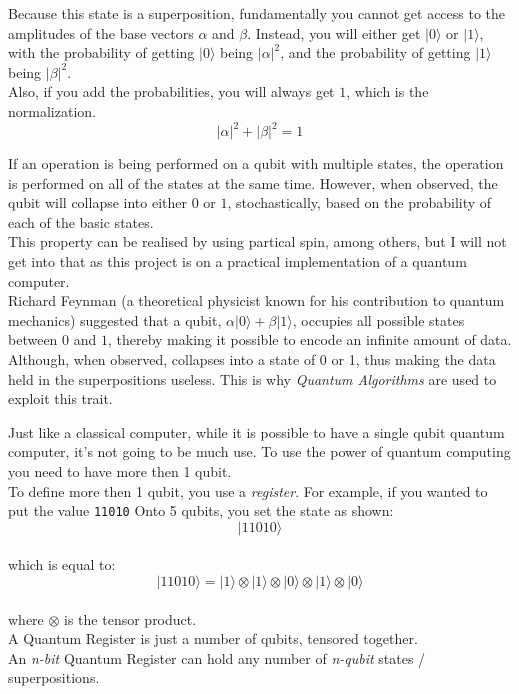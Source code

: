\documentclass[../main.tex]{subfiles}
\begin{document}
Because this state is a superposition, fundamentally you cannot get
access to the amplitudes of the base vectors \(\alpha\) and \(\beta\).
Instead, you will either get \(\lvert0\rangle\) or \(\lvert1\rangle\), with the
probability of getting \(\lvert0\rangle\) being \(\lvert\alpha\lvert^2\), and the
probability of getting \(\lvert1\rangle\) being \(\lvert\beta\lvert^2\).\\
Also, if you add the probabilities, you will always get \(1\), which is
the normalization.\\
\begin{equation}
	\lvert\alpha\lvert^2 + \lvert\beta\lvert^2 = 1
\end{equation}

If an operation is being performed on a qubit with multiple states, the
operation is performed on all of the states at the same time. However,
when observed, the qubit will collapse into either \(0\) or \(1\),
stochastically, based on the probability of each of the basic states.\\
This property can be realised by using partical spin, among others, but
I will not get into that as this project is on a practical
implementation of a quantum computer.\\
Richard Feynman (a theoretical physicist known for his contribution to
quantum mechanics) suggested that a qubit,
\(\alpha\lvert0\rangle + \beta\lvert1\rangle\), occupies all possible states
between \(0\) and \(1\), thereby making it possible to encode an
infinite amount of data. Although, when observed, collapses into a state
of 0 or 1, thus making the data held in the superpositions useless. This
is why \emph{Quantum Algorithms} are used to exploit this trait.

Just like a classical computer, while it is possible to have a single
qubit quantum computer, it's not going to be much use. To use the power
of quantum computing you need to have more then 1 qubit.\\
To define more then 1 qubit, you use a \emph{register}. For example, if
you wanted to put the value \texttt{11010} Onto 5 qubits, you set the
state as shown:\\
\[
\lvert11010\rangle\]\\
which is equal to:\\
\[
\lvert11010\rangle = \lvert1\rangle \otimes \lvert1\rangle \otimes \lvert0\rangle \otimes \lvert1\rangle \otimes \lvert0\rangle\]\\
where \(\otimes\) is the tensor product.\\
A Quantum Register is just a number of qubits, tensored together.\\
An \emph{n-bit} Quantum Register can hold any number of \emph{n-qubit}
states / superpositions.
\end{document}
